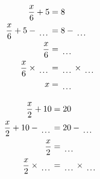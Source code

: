 \documentclass[12pt]{article}
\newcounter{minipagecount}
\begin{document}
\begin{multicols}{2}
\begin{minipage}[t]{0.45\textwidth}
    \raggedright %
    \begin{align*} %
        \frac{x}{6} + 5 &= 8\\
        \frac{x}{6} + 5 - \dotuline{\hspace{5mm}} &= 8 - \dotuline{\hspace{5mm}}\\
        \frac{x}{6} &= \dotuline{\hspace{5mm}}\\
        \frac{x}{6} \times\dotuline{\hspace{5mm}} &= \dotuline{\hspace{5mm}} \times\dotuline{\hspace{5mm}}\\
        x &= \dotuline{\hspace{5mm}}\\
    \end{align*}
\end{minipage} %
\noindent{(\theminipagecount)}\hspace{0.1mm} %
\begin{minipage}[t]{0.45\textwidth} %
    \vspace{-26pt}  %
    \raggedright %
    \begin{align*} %
        \frac{x}{2} + 10 &= 20\\
        \frac{x}{2} + 10 - \dotuline{\hspace{5mm}} &= 20 - \dotuline{\hspace{5mm}}\\
        \frac{x}{2} &= \dotuline{\hspace{5mm}}\\
        \frac{x}{2} \times\dotuline{\hspace{5mm}} &= \dotuline{\hspace{5mm}} \times\dotuline{\hspace{5mm}}\\

\end{align*}
\end{minipage}
\end{multicols}
\end{document}
